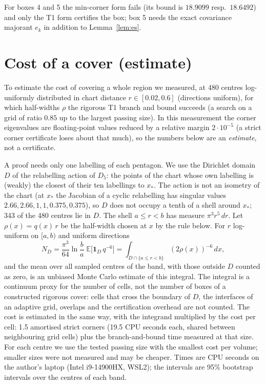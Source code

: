 \documentclass[11pt]{article}
\theoremstyle{remark}
\begin{document}
For boxes 4 and 5 the min-corner form fails (its bound is $18.9099$ resp.\ $18.6492$) and only the T1 form certifies the box; box 5 needs the exact covariance majorant $e_k$ in addition to Lemma~\ref{lem:es}.

\section{Cost of a cover (estimate)}\label{sec:cost}
To estimate the cost of covering a whole region we measured, at 480 centres log-uniformly distributed in chart distance $r\in[0.02,0.6]$ (directions uniform), for which half-widths $\rho$ the rigorous T1 branch and bound succeeds (a search on a grid of ratio $0.85$ up to the largest passing size). In this measurement the corner eigenvalues are floating-point values reduced by a relative margin $2\cdot10^{-5}$ (a strict corner certificate loses about that much), so the numbers below are an \emph{estimate}, not a certificate.

A proof needs only one labelling of each pentagon. We use the Dirichlet domain $D$ of the relabelling action of $D_5$: the points of the chart whose own labelling is (weakly) the closest of their ten labellings to $x_*$. The action is not an isometry of the chart (at $x_*$ the Jacobian of a cyclic relabelling has singular values $2.66,2.66,1,1,0.375,0.375$), so $D$ does not occupy a tenth of a shell around $x_*$; 343 of the 480 centres lie in $D$. The shell $a\le r<b$ has measure $\pi^3r^5\,dr$. Let $\rho(x)=q(x)\,r$ be the half-width chosen at $x$ by the rule below. For $r$ log-uniform on $[a,b)$ and uniform directions
\[ N_D=\frac{\pi^3}{64}\ln\frac ba\;\mathbb E\bigl[\mathbf 1_D\,q^{-6}\bigr]=\int_{D\cap\{a\le r<b\}}(2\rho(x))^{-6}\,dx, \]
and the mean over all sampled centres of the band, with those outside $D$ counted as zero, is an unbiased Monte Carlo estimate of this integral. The integral is a continuum proxy for the number of cells, not the number of boxes of a constructed rigorous cover: cells that cross the boundary of $D$, the interfaces of an adaptive grid, overlaps and the certification overhead are not counted. The cost is estimated in the same way, with the integrand multiplied by the cost per cell: 1.5 amortised strict corners (19.5 CPU seconds each, shared between neighbouring grid cells) plus the branch-and-bound time measured at that size. For each centre we use the tested passing size with the smallest cost per volume; smaller sizes were not measured and may be cheaper. Times are CPU seconds on the author's laptop (Intel i9-14900HX, WSL2); the intervals are 95\% bootstrap intervals over the centres of each band.
\end{document}
